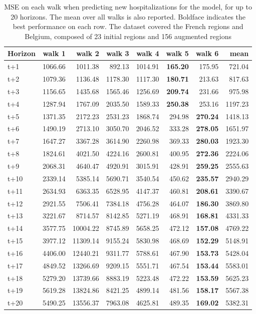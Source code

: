 \begin{table}[H]
\centering
\caption{MSE on each walk when predicting new hospitalizations for the model, for up to 20 horizons. The mean over all walks is also reported. Boldface indicates the best performance on each row. The dataset covered the French regions and Belgium, composed of 23 initial regions and 156 augmented regions }
\label{tab:MSE_walk_encoder_decoder}
\begin{tabular}{lrrrrrrr}
\toprule
Horizon &  walk 1 &   walk 2 &  walk 3 &  walk 4 &  walk 5 &  walk 6 &    mean \\
\midrule
t+1  & 1066.66  & 1011.38  & 892.13  & 1014.91  & \textbf{165.20}  & 175.95  & 721.04  \\
t+2  & 1079.36  & 1136.48  & 1178.30  & 1117.30  & \textbf{180.71}  & 213.63  & 817.63  \\
t+3  & 1156.65  & 1435.68  & 1565.46  & 1256.69  & \textbf{209.74}  & 231.66  & 975.98  \\
t+4  & 1287.94  & 1767.09  & 2035.50  & 1589.33  & \textbf{250.38}  & 253.16  & 1197.23  \\
t+5  & 1371.35  & 2172.23  & 2531.23  & 1868.74  & 294.98  & \textbf{270.24}  & 1418.13  \\
t+6  & 1490.19  & 2713.10  & 3050.70  & 2046.52  & 333.28  & \textbf{278.05}  & 1651.97  \\
t+7  & 1647.27  & 3367.28  & 3614.90  & 2260.98  & 369.33  & \textbf{280.03}  & 1923.30  \\
t+8  & 1824.61  & 4021.50  & 4224.16  & 2600.81  & 400.95  & \textbf{272.36}  & 2224.06  \\
t+9  & 2068.31  & 4640.47  & 4920.91  & 3015.91  & 428.91  & \textbf{259.25}  & 2555.63  \\
t+10  & 2339.14  & 5385.14  & 5690.71  & 3540.54  & 450.62  & \textbf{235.57}  & 2940.29  \\
t+11  & 2634.93  & 6363.35  & 6528.95  & 4147.37  & 460.81  & \textbf{208.61}  & 3390.67  \\
t+12  & 2921.55  & 7506.41  & 7384.18  & 4756.28  & 464.07  & \textbf{186.30}  & 3869.80  \\
t+13  & 3221.67  & 8714.57  & 8142.85  & 5271.19  & 468.91  & \textbf{168.81}  & 4331.33  \\
t+14  & 3577.75  & 10004.22  & 8745.89  & 5658.25  & 472.12  & \textbf{157.08}  & 4769.22  \\
t+15  & 3977.12  & 11309.14  & 9155.24  & 5830.98  & 468.69  & \textbf{152.29}  & 5148.91  \\
t+16  & 4406.00  & 12440.21  & 9311.77  & 5788.61  & 467.90  & \textbf{153.73}  & 5428.04  \\
t+17  & 4849.52  & 13266.69  & 9209.15  & 5551.71  & 467.54  & \textbf{153.44}  & 5583.01  \\
t+18  & 5279.20  & 13739.66  & 8883.19  & 5223.48  & 472.22  & \textbf{153.59}  & 5625.23  \\
t+19  & 5619.28  & 13824.86  & 8421.25  & 4899.14  & 481.56  & \textbf{158.17}  & 5567.38  \\
t+20  & 5490.25  & 13556.37  & 7963.08  & 4625.81  & 489.35  & \textbf{169.02}  & 5382.31  \\


\end{tabular}
\end{table}
